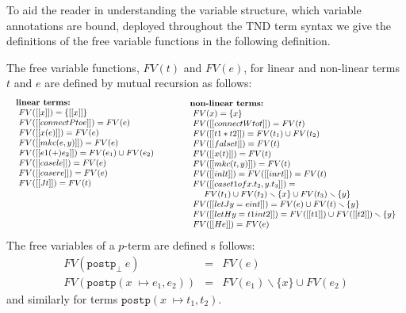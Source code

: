 To aid the reader in understanding the variable structure, which
variable annotations are bound, deployed throughout the TND term
syntax we give the definitions of the free variable functions in the
following definition.
\begin{definition}
The free variable functions, $FV(t)$ and $FV(e)$, for linear and
non-linear terms $t$ and $e$ are defined by mutual recursion as
follows:
\[ \small
\begin{array}{lll}  
  \begin{array}{lll}
    \textbf{linear terms:}\\
    \,\,FV([[x]])  = \{ [[x]]\}\\
    \,\,FV([[connectP to e]]) = FV(e) \\ 
    \,\,FV([[x(e)]]) = FV(e)\\
    \,\,FV([[mkc(e,y)]]) = FV(e)\\
    \,\,FV([[e1 (+) e_2]]) = FV(e_1) \cup FV(e_2)\\
    \,\,FV([[casel e]]) = FV(e)\\
    \,\,FV([[caser e]]) = FV(e)\\    
    \,\,FV([[J t]]) = FV(t)\\
    \\
    \\
    \\[13px]
  \end{array}
  & \quad &  
  \begin{array}{lll}
    \textbf{non-linear terms:}\\
    \,\,FV(x) = \{ x\}\\
    \,\,FV([[connectW to t]]) = FV(t) \\ 
    \,\,FV([[t1 * t2]])  = FV(t_1)\cup FV(t_2) \\
    \,\,FV([[false t]])  = FV(t) \\
    \,\,FV([[x(t)]]) = FV(t)\\
    \,\,FV([[mkc(t,y)]]) = FV(t)\\
    \,\,FV([[inl t]]) = FV([[inr t]]) = FV(t)\\
    \,\,FV([[case t1 of x.t_2,y.t_3]]) = \\
    \,\,\,\,\,\,\,\,\,\,FV(t_1)\cup FV(t_2)\smallsetminus\{x\}\cup FV(t_3)\smallsetminus \{y\}\\
    \,\,FV([[let J y = e in t]]) = FV(e)\cup FV(t)\smallsetminus \{y\} \\
    \,\,FV([[let H y = t1 in t2]]) = FV([[t1]])\cup FV([[t2]])\smallsetminus \{y\} \\
    \,\,FV([[H e]]) = FV(e)\\
  \end{array}
\end{array}
\]
The free variables of a $p$-term are defined s follows: 
\[
\begin{array}{rll}
  FV(\mathtt{postp}_{\bot}\ e) & = & FV(e)\\
  FV(\mathtt{postp} (x 􏰀\mapsto e_1, e_2)) & = & FV(e_1) \smallsetminus \{x\} \cup FV(e_2)
\end{array}
\] 
and similarly for terms $\mathtt{postp} (x 􏰀\mapsto t_1, t_2)$.
\end{definition}

